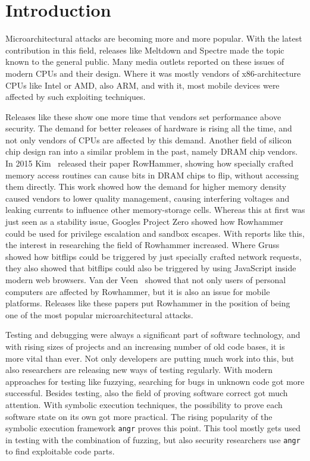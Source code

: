 \chapter{Introduction}\label{sec:intro}

Microarchitectural attacks are becoming more and more popular. With the latest
contribution in this field, releases like Meltdown\cite{meltdown} and
Spectre\cite{spectre} made the topic known to the general public. Many media
outlets reported on these issues of modern CPUs and their design. Where it was
mostly vendors of x86-architecture CPUs like Intel or AMD, also ARM, and with
it, most mobile devices were affected by such exploiting techniques.

Releases like these show one more time that vendors set performance above
security. The demand for better releases of hardware is rising all the time, and
not only vendors of CPUs are affected by this demand. Another field of silicon
chip design ran into a similar problem in the past, namely DRAM chip vendors. In
2015 Kim~\etal\cite{rowhammergeneral} released their paper \textquotedbl
RowHammer\textquotedbl, showing how specially crafted memory access routines
can cause bits in DRAM chips to flip, without accessing them directly. This
work showed how the demand for higher memory density caused vendors to lower
quality management, causing interfering voltages and leaking currents to
influence other memory-storage cells. Whereas this at first was just seen as a
stability issue, Google\textquotesingle s Project Zero showed how Rowhammer
could be used for privilege escalation and sandbox
escapes\cite{projectzerorow}. With reports like this, the interest in
researching the field of Rowhammer increased. Where Gruss~\etal\cite{nethammer}
showed how bitflips could be triggered by just specially crafted network
requests, they also showed that bitflips could also be triggered by using
JavaScript inside modern web browsers\cite{rowhammerjs}. Van der
Veen~\etal\cite{drammer} showed that not only users of personal computers are
affected by Rowhammer, but it is also an issue for mobile platforms. Releases
like these papers put Rowhammer in the position of being one of the most popular
microarchitectural attacks.

Testing and debugging were always a significant part of software technology, and
with rising sizes of projects and an increasing number of old code bases, it is
more vital than ever. Not only developers are putting much work into this, but
also researchers are releasing new ways of testing regularly. With modern
approaches for testing like fuzzying, searching for bugs in unknown code got
more successful. Besides testing, also the field of proving software correct got
much attention. With symbolic execution techniques, the possibility to prove
each software state on its own got more practical. The rising popularity of the
symbolic execution framework \texttt{angr}\cite{angrpaper} proves this point.
This tool mostly gets used in testing with the combination of fuzzing, but also
security researchers use \texttt{angr} to find exploitable code parts.

